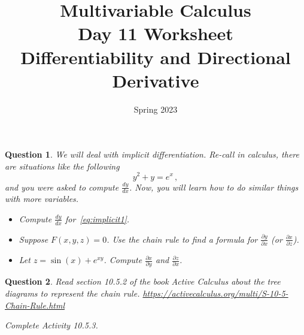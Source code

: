 \documentclass{amsart}
\title{ Multivariable Calculus \\ Day 11 Worksheet \\ Differentiability and  Directional Derivative }
\date{Spring 2023}
\newtheorem{question}{Question}
\theoremstyle{definition}
\begin{document}
\maketitle

\begin{question}
    We will deal with implicit differentiation.
    Re-call in calculus, there are situations like the following
    \begin{equation}
        \label{eq:implicit1}
        y^2 + y = e^x \,,
    \end{equation}
    and you were asked to compute $\frac{dy}{dx}$.
    Now, you will learn how to do similar things with more variables.
    \begin{itemize}
    \item Compute $\frac{dy}{dx}$ for~\eqref{eq:implicit1}.
    \item Suppose  $F(x,y,z) = 0$.
        Use the chain rule to find a formula for $\frac{\partial y}{\partial x}$ 
        (or $\frac{\partial x}{\partial z}$).
    \item Let $z = \sin(x) + e^{xy}$.
        Compute $\frac{\partial x}{\partial y}$ and $\frac{\partial z}{\partial x}$.
    \end{itemize}
\end{question}


\begin{question}
    Read section 10.5.2 of the book Active Calculus
    about the tree diagrams to represent 
    the chain rule.
    \url{https://activecalculus.org/multi/S-10-5-Chain-Rule.html}
    
    Complete Activity 10.5.3.
\end{question}
\end{document}
